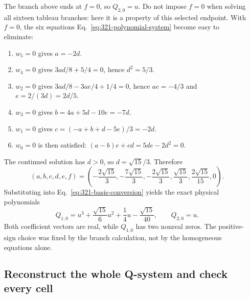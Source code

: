 \documentclass[11pt]{article}
\begin{document}
The branch above ends at $f=0$, so $Q_{2,0}=u$.
Do not impose $f=0$ when solving all sixteen tableau branches: here it
is a property of this selected endpoint. With $f=0$, the six equations
Eq.~\eqref{eq:321-polynomial-system} become easy to eliminate:
\begin{enumerate}
 \item $w_5=0$ gives $a=-2d$.
 \item $w_4=0$ gives $3ad/8+5/4=0$, hence $d^2=5/3$.
 \item $w_2=0$ gives $3ad/8-3ae/4+1/4=0$, hence $ae=-4/3$
       and $e=2/(3d)=2d/5$.
 \item $w_3=0$ gives $b=4a+5d-10e=-7d$.
 \item $w_1=0$ gives $c=(-a+b+d-5e)/3=-2d$.
 \item $w_0=0$ is then satisfied: $(a-b)e+cd=5de-2d^2=0$.
\end{enumerate}
The continued solution has $d>0$, so $d=\sqrt{15}/3$. Therefore
\begin{equation}
 \label{eq:321-exact-elementary}
 (a,b,c,d,e,f)=\left(-\frac{2\sqrt{15}}3,-\frac{7\sqrt{15}}3,
 -\frac{2\sqrt{15}}3,\frac{\sqrt{15}}3,\frac{2\sqrt{15}}{15},0\right).
\end{equation}
Substituting into Eq.~\eqref{eq:321-basis-conversion} yields the exact
physical polynomials
\begin{equation}
 \label{eq:321-exact-physical}
 \boxed{Q_{1,0}=u^3+\frac{\sqrt{15}}6u^2+\frac14u-
                     \frac{\sqrt{15}}{40},\qquad Q_{2,0}=u.}
\end{equation}
Both coefficient vectors are real, while $Q_{1,0}$ has two nonreal
zeros. The positive-sign choice was fixed by the branch calculation,
not by the homogeneous equations alone.

\subsection{Reconstruct the whole Q-system and check every cell}
\end{document}
